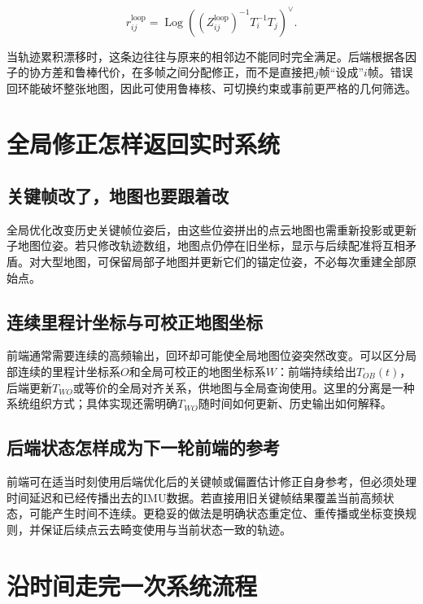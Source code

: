 \begin{equation*}
r_{ij}^{\mathrm{loop}}
=\operatorname{Log}\!\left((Z_{ij}^{\mathrm{loop}})^{-1}T_i^{-1}T_j\right)^\vee.
\end{equation*}

当轨迹累积漂移时，这条边往往与原来的相邻边不能同时完全满足。后端根据各因子的协方差和鲁棒代价，在多帧之间分配修正，而不是直接把$j$帧“设成”$i$帧。错误回环能破坏整张地图，因此可使用鲁棒核、可切换约束或事前更严格的几何筛选。

\section{全局修正怎样返回实时系统}

\subsection{关键帧改了，地图也要跟着改}

全局优化改变历史关键帧位姿后，由这些位姿拼出的点云地图也需重新投影或更新子地图位姿。若只修改轨迹数组，地图点仍停在旧坐标，显示与后续配准将互相矛盾。对大型地图，可保留局部子地图并更新它们的锚定位姿，不必每次重建全部原始点。

\subsection{连续里程计坐标与可校正地图坐标}

前端通常需要连续的高频输出，回环却可能使全局地图位姿突然改变。可以区分局部连续的里程计坐标系$O$和全局可校正的地图坐标系$W$：前端持续给出$T_{OB}(t)$，后端更新$T_{WO}$或等价的全局对齐关系，供地图与全局查询使用。这里的分离是一种系统组织方式；具体实现还需明确$T_{WO}$随时间如何更新、历史输出如何解释。

\subsection{后端状态怎样成为下一轮前端的参考}

前端可在适当时刻使用后端优化后的关键帧或偏置估计修正自身参考，但必须处理时间延迟和已经传播出去的IMU数据。若直接用旧关键帧结果覆盖当前高频状态，可能产生时间不连续。更稳妥的做法是明确状态重定位、重传播或坐标变换规则，并保证后续点云去畸变使用与当前状态一致的轨迹。

\section{沿时间走完一次系统流程}

